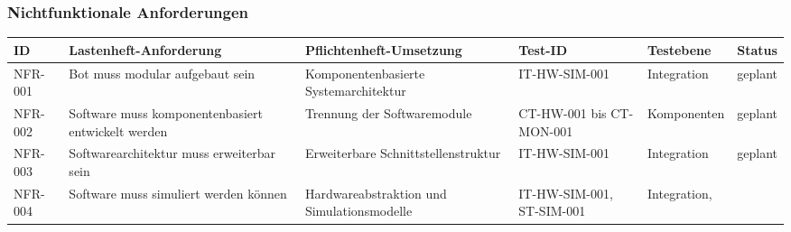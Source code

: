 \documentclass[
  a4paper,
  12pt,
  DIV=12,        %
  parskip=half,  %
  headings=small %
]{scrartcl}
\theoremstyle{definition}
\theoremstyle{definition}
\begin{document}
\newpage

\begin{landscape}
\subsubsection{Nichtfunktionale
Anforderungen}\label{nichtfunktionale-anforderungen}

\begin{longtable}[]{@{}
  >{\raggedright\arraybackslash}p{}
  >{\raggedright\arraybackslash}p{}
  >{\raggedright\arraybackslash}p{}
  >{\raggedright\arraybackslash}p{}
  >{\raggedright\arraybackslash}p{}
  >{\raggedright\arraybackslash}p{}@{}}
\toprule\noalign{}
\begin{minipage}[b]{\linewidth}\raggedright
ID
\end{minipage} & \begin{minipage}[b]{\linewidth}\raggedright
Lastenheft-Anforderung
\end{minipage} & \begin{minipage}[b]{\linewidth}\raggedright
Pflichtenheft-Umsetzung
\end{minipage} & \begin{minipage}[b]{\linewidth}\raggedright
Test-ID
\end{minipage} & \begin{minipage}[b]{\linewidth}\raggedright
Testebene
\end{minipage} & \begin{minipage}[b]{\linewidth}\raggedright
Status
\end{minipage} \\
\midrule\noalign{}
\endhead
\bottomrule\noalign{}
\endlastfoot
NFR-001 & Bot muss modular aufgebaut sein & Komponentenbasierte
Systemarchitektur & IT-HW-SIM-001 & Integration & geplant \\
NFR-002 & Software muss komponentenbasiert entwickelt werden & Trennung
der Softwaremodule & CT-HW-001 bis CT-MON-001 & Komponenten &
geplant \\
NFR-003 & Softwarearchitektur muss erweiterbar sein & Erweiterbare
Schnittstellenstruktur & IT-HW-SIM-001 & Integration & geplant \\
NFR-004 & Software muss simuliert werden können & Hardwareabstraktion
und Simulationsmodelle & IT-HW-SIM-001, ST-SIM-001 & Integration,

\end{longtable}
\end{landscape}
\end{document}
